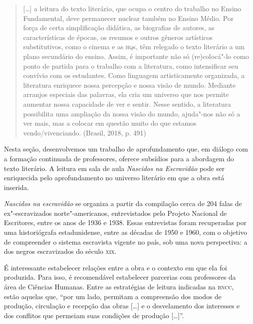 \documentclass[11pt]{extarticle}
\begin{document}
\begin{enumerate}
\begin{enumerate}
\begin{enumerate}
\begin{quote}
{[}\ldots{}{]} a leitura do texto literário, que ocupa o centro do trabalho
no Ensino Fundamental, deve permanecer nuclear também no Ensino Médio.
Por força de certa simplificação didática, as biografias de autores, as
características de épocas, os resumos e outros gêneros artísticos
substitutivos, como o cinema e as \textsc{hq}s, têm relegado o texto literário a
um plano secundário do ensino. Assim, é importante não só (re)colocá"-lo
como ponto de partida para o trabalho com a literatura, como
intensificar seu convívio com os estudantes. Como linguagem
artisticamente organizada, a literatura enriquece nossa percepção e
nossa visão de mundo. Mediante arranjos especiais das palavras, ela cria
um universo que nos permite aumentar nossa capacidade de ver e sentir.
Nesse sentido, a literatura possibilita uma ampliação da nossa visão do
mundo, ajuda"-nos não só a ver mais, mas a colocar em questão muito do
que estamos vendo/vivenciando. (Brasil, 2018, p. 491)
\end{quote}

Nesta seção, desenvolvemos um trabalho de aprofundamento que, em diálogo
com a formação continuada de professores, oferece subsídios para a
abordagem do texto literário. A leitura em sala de aula \emph{Nascidos
na Escravidão} pode ser enriquecida pelo aprofundamento no universo
literário em que a obra está inserida.

\emph{Nascidos na escravidão} se organiza a partir da compilação cerca
de 204 falas de ex"-escravizados norte"-americanos, entrevistados pelo
Projeto Nacional de Escritores, entre os anos de 1936 e 1938. Essas
entrevistas foram recuperadas por uma historiógrafa estadunidense, entre
as décadas de 1950 e 1960, com o objetivo de compreender o sistema
escravista vigente no país, sob uma nova perspectiva: a dos negros
escravizados do século \textsc{xix}.






É interessante estabelecer relações entre a obra e o contexto em que ela
foi produzida. Para isso, é recomendável estabelecer parcerias com
professores da área de Ciências Humanas. Entre as estratégias de leitura
indicadas na \textsc{bncc}, estão aquelas que, ``por um lado, permitam a
compreensão dos modos de produção, circulação e recepção das obras
{[}\ldots{}{]} e o desvelamento dos interesses e dos conflitos que permeiam
suas condições de produção {[}\ldots{}{]}''.


\end{enumerate}
\end{enumerate}
\end{enumerate}
\end{document}
